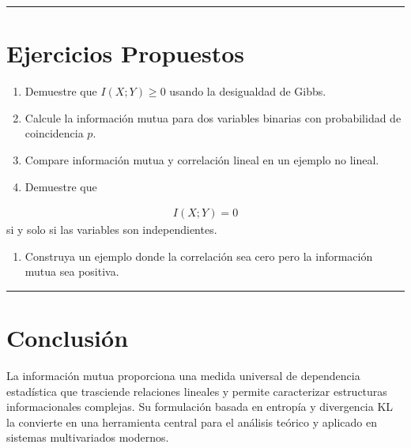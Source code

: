 \documentclass[letterpaper,10pt,english]{jupyterBook}
\begin{document}
\bigskip\hrule\bigskip



\section{Ejercicios Propuestos}
\label{\detokenize{01_theory/mutual_information:ejercicios-propuestos}}\begin{enumerate}
%
\item {} 
\sphinxAtStartPar
Demuestre que \(I(X;Y)\ge 0\) usando la desigualdad de Gibbs.

\item {} 
\sphinxAtStartPar
Calcule la información mutua para dos variables binarias con
probabilidad de coincidencia \(p\).

\item {} 
\sphinxAtStartPar
Compare información mutua y correlación lineal en un ejemplo no lineal.

\item {} 
\sphinxAtStartPar
Demuestre que

\end{enumerate}
\begin{equation*}
\begin{split}
I(X;Y)=0
\end{split}
\end{equation*}
\sphinxAtStartPar
si y solo si las variables son independientes.
\begin{enumerate}
%
\setcounter{enumi}{4}
\item {} 
\sphinxAtStartPar
Construya un ejemplo donde la correlación sea cero pero la
información mutua sea positiva.

\end{enumerate}


\bigskip\hrule\bigskip



\section{Conclusión}
\label{\detokenize{01_theory/mutual_information:conclusion}}
\sphinxAtStartPar
La información mutua proporciona una medida universal de dependencia
estadística que trasciende relaciones lineales y permite caracterizar
estructuras informacionales complejas. Su formulación basada en entropía
y divergencia KL la convierte en una herramienta central para el análisis
teórico y aplicado en sistemas multivariados modernos.
\end{document}
